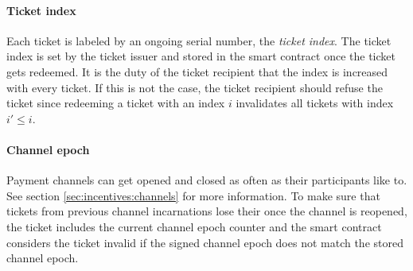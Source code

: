 \paragraph{Ticket index}
\label{sec:tickets:issuance:ticketindex}

Each ticket is labeled by an ongoing serial number, the \textit{ticket index}. The ticket index is set by the ticket issuer and stored in the smart contract once the ticket gets redeemed. It is the duty of the ticket recipient that the index is increased with every ticket. If this is not the case, the ticket recipient should refuse the ticket since redeeming a ticket with an index $i$ invalidates all tickets with index $i' \le i$.

\paragraph{Channel epoch}
\label{sec:tickets:issuance:channelepoch}

Payment channels can get opened and closed as often as their participants like to. See section \ref{sec:incentives:channels} for more information. To make sure that tickets from previous channel incarnations lose their once the channel is reopened, the ticket includes the current channel epoch counter and the smart contract considers the ticket invalid if the signed channel epoch does not match the stored channel epoch.